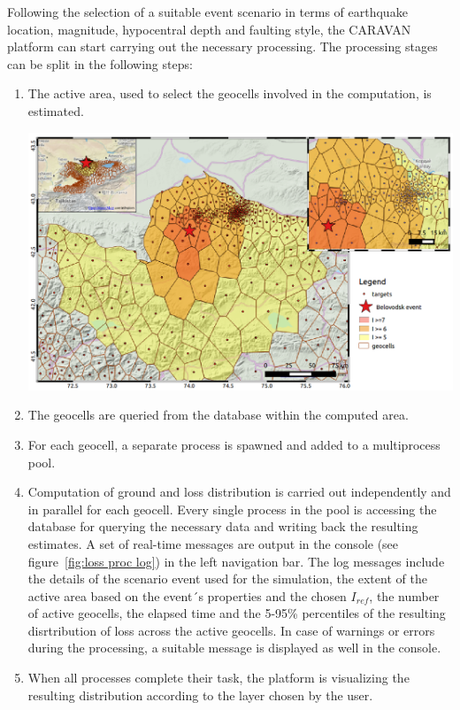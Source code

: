 \documentclass[12p]{article}
\begin{document}
Following the selection of a suitable event scenario in terms of earthquake
location, magnitude, hypocentral depth and faulting style, the CARAVAN platform
can start carrying out the necessary processing. The processing stages can be
split in the following steps:
\begin{enumerate}
	\item{The active area, used to select the geocells involved in the
computation, is estimated.
\begin{center}
	\includegraphics[width=\textwidth]{active_area}
\end{center}}
	\item{The geocells are queried from the database within the computed
area.}
	\item{For each geocell, a separate process is spawned and added to a
multiprocess pool.}
	\item{Computation of ground and loss distribution is carried out
independently and in parallel for each geocell. Every single process in the pool
is accessing the database for querying the necessary data and writing back the
resulting estimates. A set of real-time messages are output in the console (see
figure~\ref{fig:loss proc log}) in the left navigation bar. The log messages
include the details of the scenario event used for the simulation, the extent of
the active area based on the event´s properties and the chosen $I_{ref}$, the
number of active geocells, the elapsed time and the 5-95\% percentiles of the
resulting disrtribution of loss across the active geocells. In case of warnings
or errors during the processing, a suitable message is displayed as well in the
console.}
	\item{When all processes complete their task, the platform is
visualizing the resulting distribution according to the layer chosen by the
user.}
\end{enumerate} 
\end{document}
